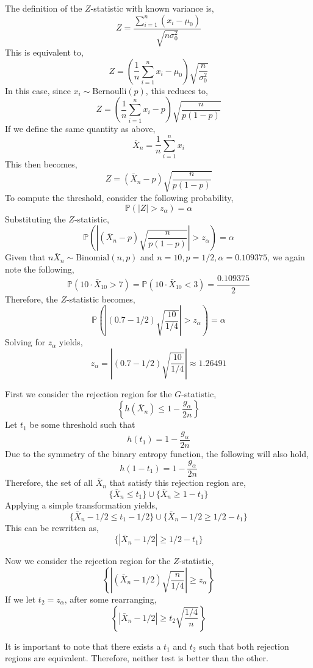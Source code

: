 \documentclass[12pt,twoside]{article}
\begin{document}
\begin{problems}
\begin{problemparts}
The definition of the $Z$-statistic with known variance is,
$$ Z = \frac{\sum_{i = 1}^n (x_i - \mu_0)}{\sqrt{n \sigma_0^2}} $$
This is equivalent to,
$$ Z = \left(\frac{1}{n} \sum_{i = 1}^n x_i - \mu_0\right)
\sqrt{\frac{n}{\sigma_0^2}} $$
In this case, since $x_i \sim \mathrm{Bernoulli}(p)$, this reduces to,
$$ Z = \left(\frac{1}{n}\sum_{i = 1}^n x_i - p\right)\sqrt{\frac{n}{p(1 -
p)}} $$
If we define the same quantity as above,
$$ \bar{X}_n = \frac{1}{n} \sum_{i = 1}^n x_i $$
This then becomes,
$$ \boxed{Z = \left(\bar{X}_n - p\right)\sqrt{\frac{n}{p(1 - p)}}} $$
To compute the threshold, consider the following probability,
$$ \mathbb{P}(|Z| > z_\alpha) = \alpha $$
Substituting the $Z$-statistic,
$$ \mathbb{P}\left(\left|\left(\bar{X}_n - p\right)\sqrt{\frac{n}{p(1 -
p)}}\right| > z_\alpha\right) = \alpha $$
Given that $n \bar{X}_n \sim \mathrm{Binomial}(n, p)$ and $n = 10, p = 1/2,
\alpha = 0.109375$, we again note the following,
$$ \mathbb{P}(10 \cdot \bar{X}_{10} > 7) = \mathbb{P}(10 \cdot \bar{X}_{10} <
3) = \frac{0.109375}{2} $$
Therefore, the $Z$-statistic becomes,
$$ \mathbb{P}\left(\left|(0.7 - 1/2) \sqrt{\frac{10}{1/4}}\right| > z_\alpha
\right) = \alpha $$
Solving for $z_\alpha$ yields,
$$ z_\alpha = \left|(0.7 - 1/2) \sqrt{\frac{10}{1/4}}\right| \approx
\boxed{1.26491} $$

\problempart  %

First we consider the rejection region for the $G$-statistic,
$$ \left\{h(\bar{X}_n) \leq 1 - \frac{g_\alpha}{2n}\right\} $$
Let $t_1$ be some threshold such that
$$ h(t_1) = 1 - \frac{g_\alpha}{2n} $$
Due to the symmetry of the binary entropy function, the following will also
hold,
$$ h(1 - t_1) = 1 - \frac{g_\alpha}{2n} $$
Therefore, the set of all $\bar{X}_n$ that satisfy this rejection region are,
$$ \{\bar{X}_n \leq t_1\} \cup \{\bar{X}_n \geq 1 - t_1\} $$
Applying a simple transformation yields,
$$ \{\bar{X}_n - 1/2 \leq t_1 - 1/2\} \cup \{\bar{X}_n - 1/2 \geq 1/2 - t_1\}
$$
This can be rewritten as,
$$ \boxed{\{| \bar{X}_n - 1/2 | \geq 1/2 - t_1 \}} $$

Now we consider the rejection region for the $Z$-statistic,
$$ \left\{\left|(\bar{X}_n - 1/2) \sqrt{\frac{n}{1/4}}\right| \geq
z_\alpha\right\} $$
If we let $t_2 = z_\alpha$, after some rearranging,
$$ \boxed{\left\{\left|\bar{X}_n - 1/2 \right| \geq
t_2\sqrt{\frac{1/4}{n}}\right\}} $$

It is important to note that there exists a $t_1$ and $t_2$ such that both
rejection regions are equivalent. Therefore, neither test is better than the
other.


\end{problemparts}
\end{problems}
\end{document}
